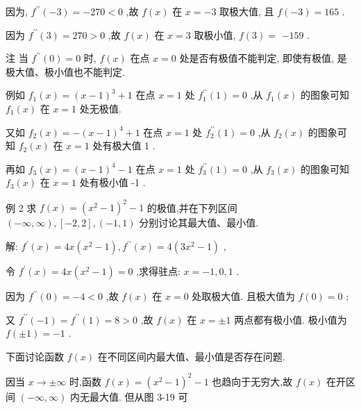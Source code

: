\documentclass[lang=cn,newtx,10pt,scheme=chinese]{elegantbook}
\begin{document}
因为, \({f}^{\prime \prime }\left( {-3}\right) = - {270} < 0\) ,故 \(f\left( x\right)\) 在 \(x = - 3\) 取极大值, 且 \(f\left( {-3}\right) = {165}\) .

因为 \({f}^{\prime \prime }\left( 3\right) = {270} > 0\) ,故 \(f\left( x\right)\) 在 \(x = 3\) 取极小值, \(f\left( 3\right) =\) \(- {159}\) .

注 当 \({f}^{\prime \prime }\left( 0\right) = 0\) 时, \(f\left( x\right)\) 在点 \(x = 0\) 处是否有极值不能判定, 即使有极值, 是极大值、极小值也不能判定.

例如 \({f}_{1}\left( x\right) = {\left( x - 1\right) }^{3} + 1\) 在点 \(x = 1\) 处 \({f}_{1}^{\prime \prime }\left( 1\right) = 0\) ,从 \({f}_{1}\left( x\right)\) 的图象可知 \({f}_{1}\left( x\right)\) 在 \(x = 1\) 处无极值.

又如 \({f}_{2}\left( x\right) = - {\left( x - 1\right) }^{4} + 1\) 在点 \(x = 1\) 处 \({f}_{2}^{\prime \prime }\left( 1\right) = 0\) ,从 \({f}_{2}\left( x\right)\) 的图象可知 \({f}_{2}\left( x\right)\) 在 \(x = 1\) 处有极大值 1 .

再如 \({f}_{3}\left( x\right) = {\left( x - 1\right) }^{4} - 1\) 在点 \(x = 1\) 处 \({f}_{3}^{\prime \prime }\left( 1\right) = 0\) ,从 \({f}_{3}\left( x\right)\) 的图象可知 \({f}_{3}\left( x\right)\) 在 \(x = 1\) 处有极小值 -1 .

例 2 求 \(f\left( x\right) = {\left( {x}^{2} - 1\right) }^{2} - 1\) 的极值,并在下列区间 \(\left( {-\infty ,\infty }\right) ,\left\lbrack {-2,2}\right\rbrack ,\left( {-1,1}\right)\) 分别讨论其最大值、最小值.

解: \({f}^{\prime }\left( x\right) = {4x}\left( {{x}^{2} - 1}\right) ,{f}^{\prime \prime }\left( x\right) = 4\left( {3{x}^{2} - 1}\right)\) ,

令 \({f}^{\prime }\left( x\right) = {4x}\left( {{x}^{2} - 1}\right) = 0\) ,求得驻点: \(x = - 1,0,1\) .

因为 \({f}^{\prime \prime }\left( 0\right) = - 4 < 0\) ,故 \(f\left( x\right)\) 在 \(x = 0\) 处取极大值. 且极大值为 \(f\left( 0\right) = 0\) ;

又 \({f}^{\prime \prime }\left( {-1}\right) = {f}^{\prime \prime }\left( 1\right) = 8 > 0\) ,故 \(f\left( x\right)\) 在 \(x = \pm 1\) 两点都有极小值. 极小值为 \(f\left( {\pm 1}\right) = - 1\) .

下面讨论函数 \(f\left( x\right)\) 在不同区间内最大值、最小值是否存在问题.

因当 \(x \rightarrow \pm \infty\) 时,函数 \(f\left( x\right) = {\left( {x}^{2} - 1\right) }^{2} - 1\) 也趋向于无穷大,故 \(f\left( x\right)\) 在开区间 \(\left( {-\infty ,\infty }\right)\) 内无最大值. 但从图 3-19 可
\end{document}
